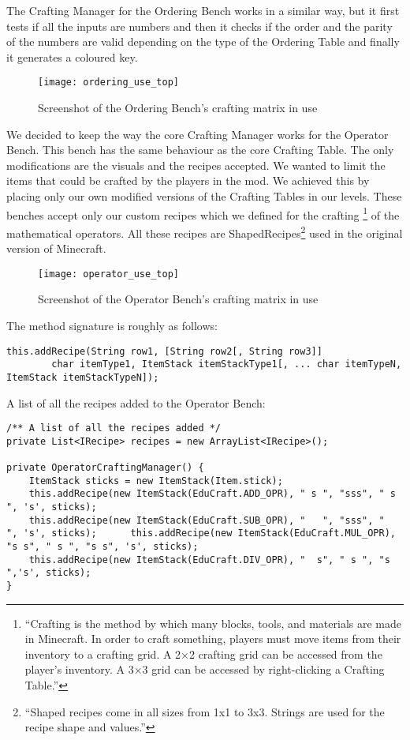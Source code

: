 The Crafting Manager for the Ordering Bench works in a similar way, but it first tests if all the inputs are numbers and then it checks if the order and the parity of the numbers are valid depending on the type of the Ordering Table and finally it generates a coloured key.\newline\newline
\begin{figure}[H]
\centering
\texttt{[image: ordering\_use\_top]}
\caption{Screenshot of the Ordering Bench's crafting matrix in use}
\end{figure}

We decided to keep the way the core Crafting Manager works for the Operator Bench. This bench has the same behaviour as the core Crafting Table. The only modifications are the visuals and the recipes accepted. We wanted to limit the items that could be crafted by the players in the mod. We achieved this by placing only our own modified versions of the Crafting Tables in our levels. These benches accept only our custom recipes which we defined for the crafting \footnote{``Crafting is the method by which many blocks, tools, and materials are made in Minecraft. In order to craft something, players must move items from their inventory to a crafting grid. A 2×2 crafting grid can be accessed from the player's inventory. A 3×3 grid can be accessed by right-clicking a Crafting Table.''} of the mathematical operators. All these recipes are ShapedRecipes\footnote{``Shaped recipes come in all sizes from 1x1 to 3x3. Strings are used for the recipe shape and values.''\cite{website:forge-shaped}} used in the original version of Minecraft.
\begin{figure}[H]
\centering
\texttt{[image: operator\_use\_top]}
\caption{Screenshot of the Operator Bench's crafting matrix in use}
\end{figure}
The method signature is roughly as follows:
\begin{lstlisting}
this.addRecipe(String row1, [String row2[, String row3]]
        char itemType1, ItemStack itemStackType1[, ... char itemTypeN, ItemStack itemStackTypeN]);
\end{lstlisting}
A list of all the recipes added to the Operator Bench:
\begin{lstlisting}
/** A list of all the recipes added */
private List<IRecipe> recipes = new ArrayList<IRecipe>();

private OperatorCraftingManager() {
	ItemStack sticks = new ItemStack(Item.stick);
	this.addRecipe(new ItemStack(EduCraft.ADD_OPR), " s ", "sss", " s ", 's', sticks);
	this.addRecipe(new ItemStack(EduCraft.SUB_OPR), "   ", "sss", "   ", 's', sticks);		this.addRecipe(new ItemStack(EduCraft.MUL_OPR), "s s", " s ", "s s", 's', sticks);
	this.addRecipe(new ItemStack(EduCraft.DIV_OPR), "  s", " s ", "s  ",'s', sticks);
}
\end{lstlisting}

